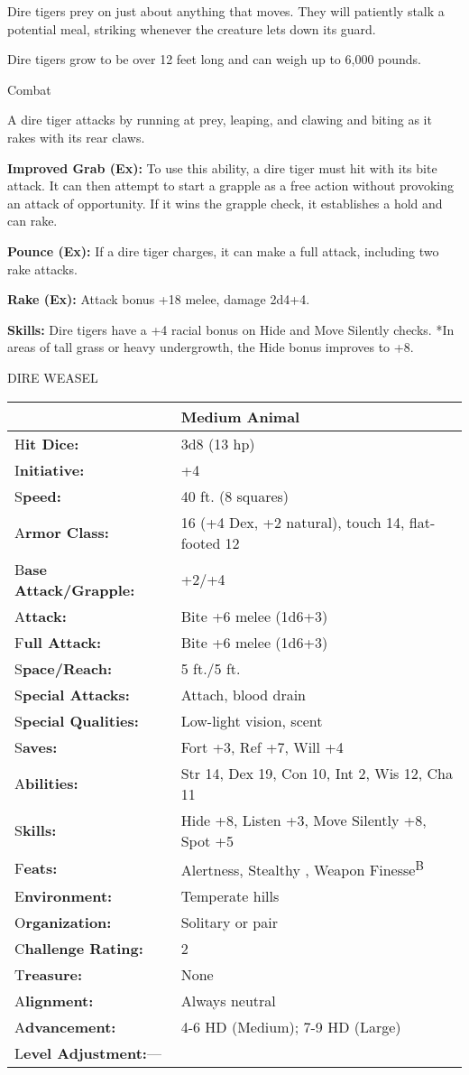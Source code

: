 \documentclass{article}
\begin{document}
Dire tigers prey on just about anything that moves. They will patiently stalk a 
potential meal, striking whenever the creature lets down its guard.

Dire tigers grow to be over 12 feet long and can weigh up to 6,000 pounds.

Combat

A dire tiger attacks by running at prey, leaping, and clawing and biting as it 
rakes with its rear claws.

\textbf{Improved Grab (Ex): }To use this ability, a dire tiger must hit with its 
bite attack. It can then attempt to start a grapple as a free action without provoking 
an attack of opportunity. If it wins the grapple check, it establishes a hold and 
can rake.

\textbf{Pounce (Ex):} If a dire tiger charges, it can make a full attack, including 
two rake attacks.

\textbf{Rake (Ex):} Attack bonus +18 melee, damage 2d4+4.

\textbf{Skills:} Dire tigers have a +4 racial bonus on Hide and Move Silently checks. 
*In areas of tall grass or heavy undergrowth, the Hide bonus improves to +8.

\vspace{12pt}
DIRE WEASEL

\begin{tabular}{|>{\raggedright}p{91pt}|>{\raggedright}p{193pt}|}
\hline
  & Medium Animal\tabularnewline
\hline
H\textbf{it Dice:} & 3d8 (13 hp)\tabularnewline
\hline
I\textbf{nitiative:} & +4\tabularnewline
\hline
S\textbf{peed:} & 40 ft. (8 squares)\tabularnewline
\hline
A\textbf{rmor Class:} & 16 (+4 Dex, +2 natural), touch 14, flat-footed 12\tabularnewline
\hline
B\textbf{ase Attack/Grapple:} & +2/+4\tabularnewline
\hline
A\textbf{ttack:} & Bite +6 melee (1d6+3)\tabularnewline
\hline
F\textbf{ull Attack:} & Bite +6 melee (1d6+3)\tabularnewline
\hline
S\textbf{pace/Reach:} & 5 ft./5 ft.\tabularnewline
\hline
S\textbf{pecial Attacks:} & Attach, blood drain\tabularnewline
\hline
S\textbf{pecial Qualities:} & Low-light vision, scent\tabularnewline
\hline
S\textbf{aves:} & Fort +3, Ref +7, Will +4\tabularnewline
\hline
A\textbf{bilities:} & Str 14, Dex 19, Con 10, Int 2, Wis 12, Cha 11\tabularnewline
\hline
S\textbf{kills:} & Hide +8, Listen +3, Move Silently +8, Spot +5\tabularnewline
\hline
F\textbf{eats:} & Alertness, Stealthy , Weapon Finesse\textsuperscript{B}\tabularnewline
\hline
E\textbf{nvironment:} & Temperate hills\tabularnewline
\hline
O\textbf{rganization:} & Solitary or pair\tabularnewline
\hline
C\textbf{hallenge Rating:} & 2\tabularnewline
\hline
T\textbf{reasure:} & None\tabularnewline
\hline
A\textbf{lignment:} & Always neutral\tabularnewline
\hline
A\textbf{dvancement:} & 4-6 HD (Medium); 7-9 HD (Large)\tabularnewline
\hline
L\textbf{evel Adjustment:}--- & \tabularnewline
\hline
\end{tabular}
\end{document}
